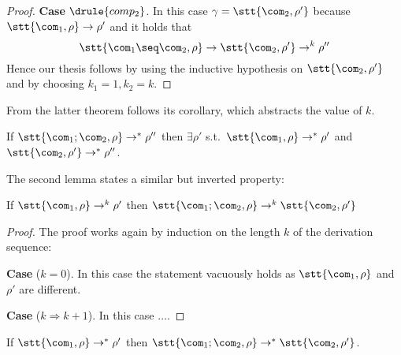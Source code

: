 \begin{proof}
  \medskip

  \textbf{Case} \(\drule{comp_2}\). In this case
  \({\gamma = \stt{\com_2, \rho'}}\) because
  \({\stt{\com_1, \rho}\to\rho'}\) and it holds that
  \begin{equation*}
    \stt{\com_1\seq\com_2, \rho}\to\stt{\com_2, \rho'} \to^k \rho''
  \end{equation*}
  Hence our thesis follows by using the inductive hypothesis on
  \(\stt{\com_2, \rho'}\) and by choosing \({k_1 = 1}, {k_2 = k}\).
\end{proof}

From the latter theorem follows its corollary, which abstracts the
value of \(k\).

\begin{corollary}\label{co:decomp}
  If \(\stt{\com_1;\com_2, \rho} \to^* \rho''\) then \(\exists \rho'\)
  s.t.~\(\stt{\com_1, \rho} \to^* \rho'\) and
  \(\stt{\com_2, \rho'}\to^* \rho''\).
\end{corollary}

The second lemma states a similar but inverted property:

\begin{lemma}\label{le:comp}
  If \(\stt{\com_1, \rho} \to^k \rho'\) then
  \(\stt{\com_1; \com_2, \rho} \to^k \stt{\com_2, \rho'}\)
\end{lemma}

\begin{proof}
  The proof works again by induction on the length \(k\) of the
  derivation sequence:

  \medskip

  \noindent
  \textbf{Case} (\(k=0\)). In this case the statement vacuously holds
  as \(\stt{\com_1, \rho}\) and \(\rho'\) are different.

  \medskip

  \noindent
  \textbf{Case} (\(k \Rightarrow k + 1\)). In this case \(\dots\).
\end{proof}

\begin{corollary}\label{co:comp}
  If \(\stt{\com_1, \rho} \to^* \rho'\) then
  \(\stt{\com_1;\com_2, \rho}\to^* \stt{\com_2, \rho'}\).
\end{corollary}


